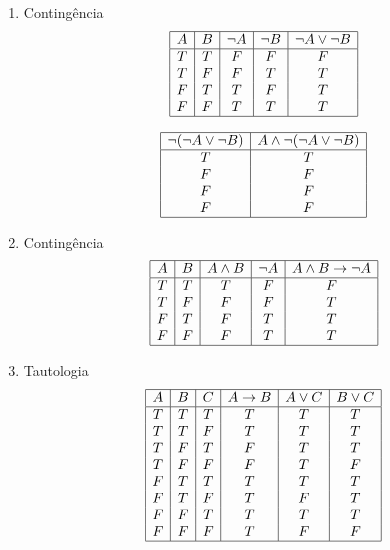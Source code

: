 \begin{enumerate}
\begin{enumerate}
			
		
			\item Conting\^encia		
			\[\begin{array}{|c|c|c|c|c|}
			\hline
			A & B & \neg A & \neg B & \neg A \lor \neg B \\ \hline
			T & T & F & F & F \\
			T & F & F & T & T \\
			F & T & T & F & T \\
			F & F & T & T & T \\
			\hline
			\end{array}
			\]
			
			
			\[\begin{array}{|c|c|}
			\hline
			\neg(\neg A \lor \neg B) & A \land \neg(\neg A \lor \neg B) \\ \hline
			T & T \\
			F & F \\
			F & F \\
			F & F \\
			\hline
			\end{array}
			\]
						
					
			\item Conting\^encia
			\[\begin{array}{|c|c|c|c|c|}
			\hline
			A & B & A \land B & \neg A & A \land B \to \neg A \\ \hline
			T & T & T & F & F\\
			T & F & F & F & T\\
			F & T & F & T & T\\
			F & F & F & T & T\\
			\hline
			\end{array}
			\]
			
			
			\item Tautologia
			\[\begin{array}{|c|c|c|c|c|c|}
			\hline
			A & B & C & A \to B & A \lor C & B \lor C \\ \hline
			T & T & T & T & T & T \\
			T & T & F & T & T & T \\
			T & F & T & F & T & T \\
			T & F & F & F & T & F \\
			F & T & T & T & T & T \\
			F & T & F & T & F & T \\
			F & F & T & T & T & T \\
			F & F & F & T & F & F \\
			\hline
			\end{array}
			\]
			

\end{enumerate}
\end{enumerate}
